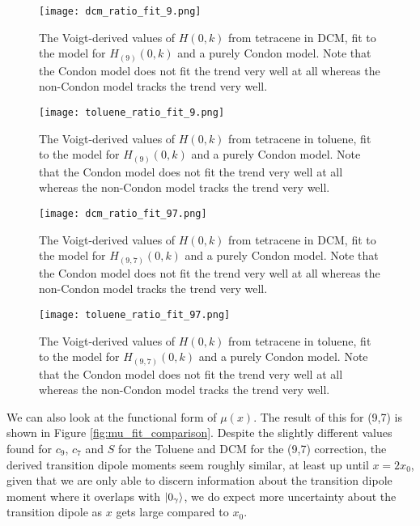 \begin{figure}
   \texttt{[image: dcm\_ratio\_fit\_9.png]}
   \caption{The Voigt-derived values of $H(0,k)$ from tetracene in DCM, fit to the model for $H_{(9)}(0,k)$ and a purely Condon model.  Note that the Condon model does not fit the trend very well at all whereas the non-Condon model tracks the trend very well.}
	\label{fig:dcm_ratio9_fit}
\end{figure}
\begin{figure}
   \texttt{[image: toluene\_ratio\_fit\_9.png]}
   \caption{The Voigt-derived values of $H(0,k)$ from tetracene in toluene, fit to the model for $H_{(9)}(0,k)$ and a purely Condon model.  Note that the Condon model does not fit the trend very well at all whereas the non-Condon model tracks the trend very well.}
	\label{fig:toluene_ratio9_fit}
\end{figure}

\begin{figure}
   \texttt{[image: dcm\_ratio\_fit\_97.png]}
   \caption{The Voigt-derived values of $H(0,k)$ from tetracene in DCM, fit to the model for $H_{(9,7)}(0,k)$ and a purely Condon model.  Note that the Condon model does not fit the trend very well at all whereas the non-Condon model tracks the trend very well.}
	\label{fig:dcm_ratio97_fit}
\end{figure}
\begin{figure}
   \texttt{[image: toluene\_ratio\_fit\_97.png]}
   \caption{The Voigt-derived values of $H(0,k)$ from tetracene in toluene, fit to the model for $H_{(9,7)}(0,k)$ and a purely Condon model.  Note that the Condon model does not fit the trend very well at all whereas the non-Condon model tracks the trend very well.}
	\label{fig:toluene_ratio97_fit}
\end{figure}



We can also look at the functional form of $\mu(x)$.  The result of this for (9,7) is shown in Figure \ref{fig:mu_fit_comparison}.  Despite the slightly different values found for $c_9$, $c_7$ and $S$ for the Toluene and DCM for the  (9,7) correction, the derived transition dipole moments seem roughly similar, at least up until $x=2x_0$, given that we are only able to discern information about the transition dipole moment where it overlaps with $\ket{0_{\gamma}}$, we do expect more uncertainty about the transition dipole as $x$ gets large compared to $x_0$.

